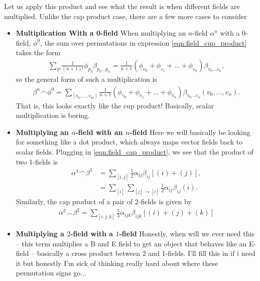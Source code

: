 \documentclass[11pt, oneside]{article} %
\numberwithin{equation}{section}
\begin{document}
Let us apply this product and see what the result is when different fields are multiplied. Unlike the cap product case, there are a few more cases to consider

\begin{itemize}
    \item {\bf Multiplication With a 0-field}
When multiplying an $n$-field $\alpha^n$ with a 0-field, $\phi^0$, the sum over permutations in expression \ref{eqn:field_cup_product} takes the form
\begin{align}
    \sum_{P} \frac{1}{(n+1)!} \phi_{p_0}\beta_{p_0 ...p_{n}} = \frac{1}{n+1}(\phi_{v_0}+\phi_{v_1}+ ... +\phi_{v_n})
    \beta_{v_0...v_n},
\end{align}
so the general form of such a multiplication is
\begin{align}
    \beta^n \frown \phi^0 = \sum_{[v_0, ... ,v_m]}\frac 1 {n+1}
    (\phi_{v_0}+\phi_{v_1}+ ... +\phi_{v_n})
    \beta_{v_0...v_n}
    (v_0,...,v_{n}).
\end{align}
That is, this looks exactly like the cup product! Basically, scalar multiplication is boring.

\item{\bf Multiplying an $n$-field with an $n$-field}
Here we will basically be looking for something like a dot product, which always maps vector fields back to scalar fields. Plugging in \cref{eqn:field_cap_product}, we see that the product of two 1-fields is
\begin{align}
    \alpha^1 \frown \beta^1 &= \sum_{[i,j]}\frac 12 \alpha_{ij}\beta_{ij} \left [ (i) + (j)\right ], \\
    &= \sum_{[i]} \sum_{[j]\rightarrow [i]}\frac 12 \alpha_{ij}\beta_{ij} (i).
\end{align}
Similarly, the cap product of a pair of 2-fields is given by
\begin{align}
    \alpha^2 \frown \beta^2 = \sum_{[i,j,k]} \frac 13 \alpha_{ijk} \beta_{ijk} \left [ (i) + (j) + (k) \right ]
\end{align}


\item{\bf Multiplying a $2$-field with a $1$-field}
Honestly, when will we ever need this -- this term multiplies a B and E field to get an object that behaves like an E-field -- basically a cross product between 2 and 1-fields. I'll fill this in if i need it but honestly I'm sick of thinking really hard about where these permutation signs go...

\end{itemize}
\end{document}
